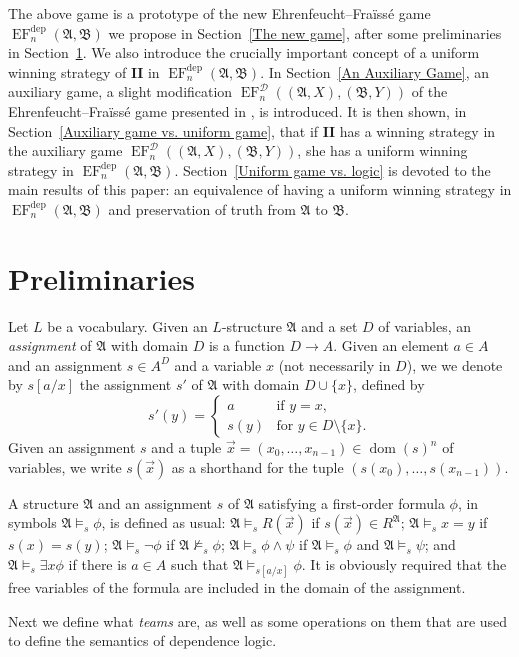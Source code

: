 \documentclass[12pt]{article}
\theoremstyle{definition}
\newcommand{\playertwo}{\mathrm{\mathbf{II}}}
\DeclareMathOperator{\EF}{EF}
\newcommand{\EFdep}{\EF^{\mathrm{dep}}}
\newcommand{\A}{\mathfrak{A}}
\newcommand{\B}{\mathfrak{B}}
\newcommand{\deplog}{\mathcal D}
\DeclareMathOperator{\dom}{dom}
\begin{document}
 The above game is a prototype of the new Ehrenfeucht--Fraïssé game $\EFdep_n(\A,\B)$ we propose in Section~\ref{The new game}, after some preliminaries in Section~\ref{pre}. We also introduce the crucially important concept of a uniform winning strategy of $\playertwo$ in $\EFdep_n(\A,\B)$.
%
In Section~\ref{An Auxiliary Game},  an auxiliary game, a slight modification $\EF^\deplog_n((\A,X),(\B,Y))$ of the Ehrenfeucht--Fraïssé game presented in \cite{MR2351449}, is introduced. It is then shown, in Section~\ref{Auxiliary game vs. uniform game}, that if $\playertwo$ has a winning strategy in the auxiliary game $\EF^\deplog_n((\A,X),(\B,Y))$, she has a uniform winning strategy in  $\EFdep_n(\A,\B)$.
%
 Section~\ref{Uniform game vs. logic} is devoted to the main results of this paper: an equivalence of having a uniform winning strategy in $\EFdep_n(\A,\B)$ and preservation of truth from $\A$ to $\B$.


\section{Preliminaries}\label{pre}

Let $L$ be a vocabulary. Given an $L$-structure $\A$ and a set $D$ of variables, an \emph{assignment} of $\A$ with domain $D$ is a function $D\to A$. Given an element $a\in A$ and an assignment $s\in A^D$ and a variable $x$ (not necessarily in $D$), we we denote by $s[a/x]$ the assignment $s'$ of $\A$ with domain $D\cup\{x\}$, defined by
\[
    s'(y) =
    \begin{cases}
        a & \text{if $y = x$,} \\
        s(y) & \text{for $y\in D\setminus\{x\}$.}
    \end{cases}
\]
Given an assignment $s$ and a tuple $\vec x = (x_0,\dots,x_{n-1})\in\dom(s)^n$ of variables, we write $s(\vec x)$ as a shorthand for the tuple $(s(x_0),\dots,s(x_{n-1}))$.

A structure $\A$ and an assignment $s$ of $\A$ satisfying a first-order formula $\phi$, in symbols $\A\models_s\phi$, is defined as usual: $\A\models_s R(\vec x)$ if $s(\vec x)\in R^\A$; $\A\models_s x = y$ if $s(x) = s(y)$; $\A\models_s\neg\phi$ if $\A\not\models_s\phi$; $\A\models_s \phi\land\psi$ if $\A\models_s\phi$ and $\A\models_s\psi$; and $\A\models_s\exists x\phi$ if there is $a\in A$ such that $\A\models_{s[a/x]}\phi$. It is obviously required that the free variables of the formula are included in the domain of the assignment.

Next we define what \emph{teams} are, as well as some operations on them that are used to define the semantics of dependence logic.
\end{document}
